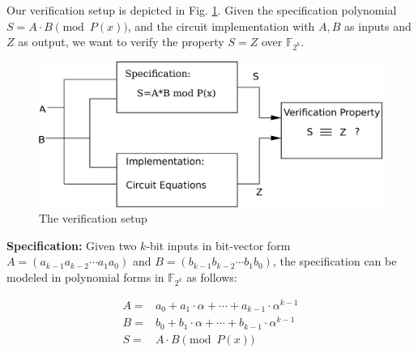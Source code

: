 Our verification setup is depicted in Fig. \ref{fig:setup}. Given the
specification polynomial $S= A \cdot B \pmod{  P(x)}$,  and the
circuit implementation with $A,B$ as inputs and $Z$ as output, we want
to verify the property $S=Z$ over $\mathbb{F}_{2^k}$. 

  
\begin{figure}[b]

\centerline{
\includegraphics[scale=0.25]{./figures/setmember.eps}
}
\caption{The verification setup}
\label{fig:setup}
\end{figure}

{\bf Specification:} Given two $k$-bit inputs in bit-vector form
$A=(a_{k-1}a_{k-2}\cdots a_{1}a_{0})$ and $B=(b_{k-1}b_{k-2}\cdots
b_{1}b_{0})$, the specification can be modeled in polynomial forms in
$\mathbb{F}_{2^k}$ as follows: 

\begin{align}
A=&a_0+a_1\cdot \alpha+\cdots+a_{k-1}\cdot \alpha^{k-1} \nonumber \\
B=&b_0+b_1\cdot \alpha+\cdots+b_{k-1}\cdot \alpha^{k-1} \nonumber \\
S=&A\cdot B \pmod {P(x)} \nonumber
\end{align}


